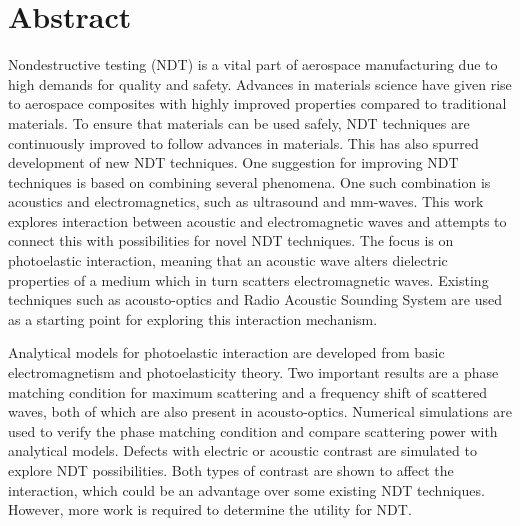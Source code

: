 \documentclass[11pt,twoside]{eitExjobb}
\begin{document}
	
	\newcommand{\addref}{\todo[color=red!40, disable]{Citation needed!}}
	\newcommand{\todoext}[1]{\todo[inline, color=yellow]{#1}}
	\newcommand{\todoint}[2][]{\todo[#1, disable]{#2}}
	
	\newcommand{\mrm}[1]{\mathrm{#1}}
	\newcommand{\eu}{\mrm{e}}
	\newcommand{\iu}{\mrm{i}}
	
	
	
	\MakeTitlePage  %
	
	\frontmatter    %
	
	\chapter*{Abstract}
	Nondestructive testing (NDT) is a vital part of aerospace manufacturing due to high demands for quality and safety. Advances in materials science have given rise to aerospace composites with highly improved properties compared to traditional materials. To ensure that materials can be used safely, NDT techniques are continuously improved to follow advances in materials. This has also spurred development of new NDT techniques. One suggestion for improving NDT techniques is based on combining several phenomena. One such combination is acoustics and electromagnetics, such as ultrasound and mm-waves. This work explores interaction between acoustic and electromagnetic waves and attempts to connect this with possibilities for novel NDT techniques. The focus is on photoelastic interaction, meaning that an acoustic wave alters dielectric properties of a medium which in turn scatters electromagnetic waves. Existing techniques such as acousto-optics and Radio Acoustic Sounding System are used as a starting point for exploring this interaction mechanism.
	
	Analytical models for photoelastic interaction are developed from basic electromagnetism and photoelasticity theory. Two important results are a phase matching condition for maximum scattering and a frequency shift of scattered waves, both of which are also present in acousto-optics. Numerical simulations are used to verify the phase matching condition and compare scattering power with analytical models. Defects with electric or acoustic contrast are simulated to explore NDT possibilities. Both types of contrast are shown to affect the interaction, which could be an advantage over some existing NDT techniques. However, more work is required to determine the utility for NDT.
	
\end{document}
